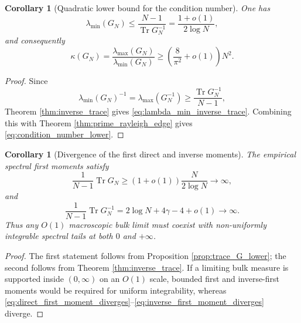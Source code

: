 \documentclass[11pt]{amsart}
\numberwithin{equation}{section}
\theoremstyle{plain}
\newtheorem{corollary}[theorem]{Corollary}
\theoremstyle{definition}
\theoremstyle{remark}
\newcommand{\Tr}{\operatorname{Tr}}
\begin{document}
\begin{corollary}[Quadratic lower bound for the condition number]
\label{cor:condition_number_lower}
One has
\begin{equation}
\lambda_{\min}(G_N)
\le \frac{N-1}{\Tr G_N^{-1}}
=\frac{1+o(1)}{2\log N},
\label{eq:lambda_min_inverse_trace}
\end{equation}
and consequently
\begin{equation}
\kappa(G_N)
=\frac{\lambda_{\max}(G_N)}{\lambda_{\min}(G_N)}
\ge
\left(\frac{8}{\pi^2}+o(1)\right)N^2.
\label{eq:condition_number_lower}
\end{equation}
\end{corollary}

\begin{proof}
Since
\begin{equation}
\lambda_{\min}(G_N)^{-1}
=\lambda_{\max}(G_N^{-1})
\ge \frac{\Tr G_N^{-1}}{N-1},
\end{equation}
Theorem \ref{thm:inverse_trace} gives \eqref{eq:lambda_min_inverse_trace}.  Combining this with Theorem \ref{thm:prime_rayleigh_edge} gives \eqref{eq:condition_number_lower}.
\end{proof}

\begin{corollary}[Divergence of the first direct and inverse moments]
\label{cor:moment_divergence}
The empirical spectral first moments satisfy
\begin{equation}
\frac{1}{N-1}\Tr G_N
\ge (1+o(1))\frac{N}{2\log N}\longrightarrow\infty,
\label{eq:direct_first_moment_diverges}
\end{equation}
and
\begin{equation}
\frac{1}{N-1}\Tr G_N^{-1}
=2\log N+4\gamma-4+o(1)\longrightarrow\infty.
\label{eq:inverse_first_moment_diverges}
\end{equation}
Thus any $O(1)$ macroscopic bulk limit must coexist with non-uniformly integrable spectral tails at both $0$ and $+\infty$.
\end{corollary}

\begin{proof}
The first statement follows from Proposition \ref{prop:trace_G_lower}; the second follows from Theorem \ref{thm:inverse_trace}.  If a limiting bulk measure is supported inside $(0,\infty)$ on an $O(1)$ scale, bounded first and inverse-first moments would be required for uniform integrability, whereas \eqref{eq:direct_first_moment_diverges}--\eqref{eq:inverse_first_moment_diverges} diverge.
\end{proof}
\end{document}

